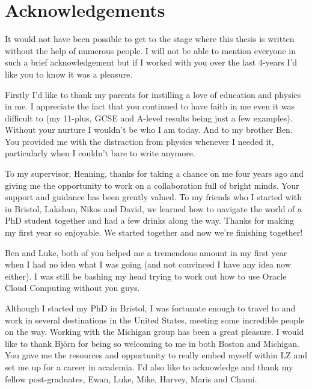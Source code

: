 %
%

\chapter*{Acknowledgements}
\begin{SingleSpace}
\par
It would not have been possible to get to the stage where this thesis is written without the help of numerous people.
I will not be able to mention everyone in such a brief acknowledgement but if I worked with you over the last 4-years I'd like you to know it was a pleasure.
\par
Firstly I'd like to thank my parents for instilling a love of education and physics in me. I appreciate the fact that you continued to have faith in me even it was difficult to (my 11-plus, GCSE and A-level results being just a few examples).
Without your nurture I wouldn't be who I am today.
And to my brother Ben.
You provided me with the distraction from physics whenever I needed it, particularly when I couldn't bare to write anymore.
\par
To my supervisor, Henning, thanks for taking a chance on me four years ago and giving me the opportunity to work on a collaboration full of bright minds. 
Your support and guidance has been greatly valued.
To my friends who I started with in Bristol, Lakshan, Nikos and David, we learned how to navigate the world of a PhD student together and had a few drinks along the way. 
Thanks for making my first year so enjoyable.
We started together and now we're finishing together!
\par
Ben and Luke, both of you helped me a tremendous amount in my first year when I had no idea what I was going (and not convinced I have any idea now either).
I was still be bashing my head trying to work out how to use Oracle Cloud Computing without you guys.
\par
Although I started my PhD in Bristol, I was fortunate enough to travel to and work in several destinations in the United States, meeting some incredible people on the way. Working with the Michigan group has been a great pleasure. 
I would like to thank Bj\"{o}rn for being so welcoming to me in both Boston and Michigan.
You gave me the resources and opportunity to really embed myself within LZ and set me up for a career in academia.
I'd also like to acknowledge and thank my fellow post-graduates, Ewan, Luke, Mike, Harvey, Maris and Chami. 

\end{SingleSpace}
